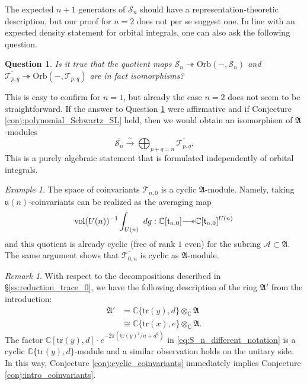 \documentclass[reqno, 11pt]{amsart} %
\numberwithin{equation}{section}
\theoremstyle{plain}
\newtheorem{question}[theorem]{Question}
\theoremstyle{definition}
\theoremstyle{remark}
\newtheorem{remark}[theorem]{Remark}
\newtheorem{example}[theorem]{Example}
\newcommand{\ov}{\overline}
\newcommand{\mr}{\mathrm}
\newcommand{\tr}{\mathrm{tr}}
\newcommand{\tensor}{\otimes}
\newcommand{\iso}{\cong}
\newcommand{\lr}{\longrightarrow}
\newcommand{\mbC}{\mathbb{C}}
\newcommand{\mcA}{\mathcal{A}}
\newcommand{\mcS}{\mathcal{S}}
\newcommand{\mcT}{\mathcal{T}}
\newcommand{\mfA}{\mathfrak{A}}
\newcommand{\mfu}{\mathfrak{u}}
\newcommand{\simlr}{\overset{\sim}{\lr}}
\newcommand{\lie}[1]{ \mathfrak{#1}}
\newcommand{\Orb}{\mathrm{Orb}}
\begin{document}
The expected $n+1$ generators of $\ov{\mcS_n}$ should have a representation-theoretic description, but our proof for $n = 2$ does not per se suggest one. In line with an expected density statement for orbital integrals, one can also ask the following question.
\begin{question}\label{qu:surjection_is_iso}
Is it true that the quotient maps $\ov{\mcS_n} \twoheadrightarrow \Orb(-,\mcS_n)$ and $\ov{\mcT_{p,q}}\twoheadrightarrow \Orb(-,\mcT_{p,q})$ are in fact isomorphisms?
\end{question}
This is easy to confirm for $n = 1$, but already the case $n = 2$ does not seem to be straightforward. If the answer to Question \ref{qu:surjection_is_iso} were affirmative and if Conjecture \ref{conj:polynomial_Schwartz_SL} held, then we would obtain an isomorphism of $\mfA$-modules
\begin{equation}\label{eq:decomp_algebraic}
\ov{\mcS_n} \simlr \bigoplus_{p+q=n} \ov{\mcT_{p,q}}.
\end{equation}
This is a purely algebraic statement that is formulated independently of orbital integrals.

\begin{example}\label{ex:cylic_T_definite}
The space of coinvariants $\ov{\mcT_{n,0}}$ is a cyclic $\mfA$-module. Namely, taking $\mfu(n)$-coinvariants can be realized as the averaging map
$$\mr{vol}(U(n))^{-1} \int_{U(n)}\ dg : \mbC[\lie t_{n,0}] {\relbar\joinrel\twoheadrightarrow} \mbC[\lie t_{n,0}]^{U(n)}$$
and this quotient is already cyclic (free of rank $1$ even) for the subring $\mcA\subset \mfA$. The same argument shows that $\ov{\mcT_{0,n}}$ is cyclic as $\mfA$-module.
\end{example}

\begin{remark}
With respect to the decompositions described in \S\ref{ss:reduction_trace_0}, we have the following description of the ring $\mfA'$ from the introduction:
\begin{equation}
\begin{aligned}
\mfA' & = \mbC\{\tr(y), d\} \tensor_\mbC \mfA\\
& \iso \mbC\{\tr(x), e\} \tensor_\mbC \mfA.
\end{aligned}
\end{equation}
The factor $\mbC[\tr(y), d]\cdot e^{-2π(\tr(y)^2/n + d^2)}$ in \eqref{eq:S_n_different_notation} is a cyclic $\mbC\{\tr(y),d\}$-module and a similar observation holds on the unitary side. In this way, Conjecture \ref{conj:cyclic_coinvariants} immediately implies Conjecture \ref{conj:intro_coinvariants}.
\end{remark}
\end{document}
